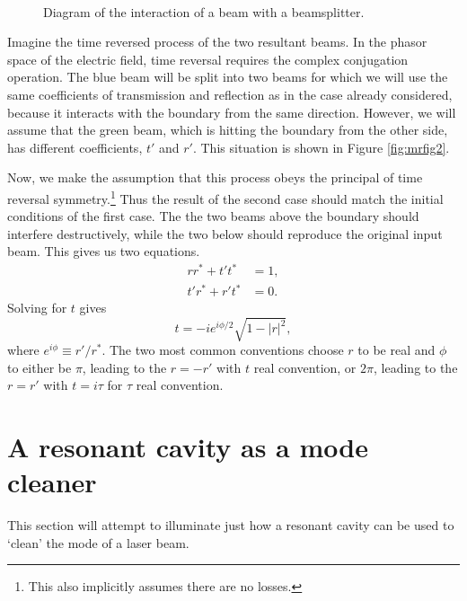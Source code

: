 \begin{figure}
  \begin{center}
  \leavevmode
  ~
  \end{center}
  \caption{Diagram of the interaction of a beam with a beamsplitter.}
  \label{fig:mrfig}
\end{figure}

Imagine the time reversed process of the two resultant beams. %
In the phasor space of the electric field, time reversal requires the complex conjugation operation. %
The blue beam will be split into two beams for which we will use the same coefficients of transmission and reflection as in the case already considered, because it interacts with the boundary from the same direction. %
However, we will assume that the green beam, which is hitting the boundary from the other side, has different coefficients, $t'$ and $r'$. %
This situation is shown in Figure \ref{fig:mrfig2}.

Now, we make the assumption that this process obeys the principal of time reversal symmetry.\footnote{This also implicitly assumes there are no losses.} Thus the result of the second case should match the initial conditions of the first case. %
The the two beams above the boundary should interfere destructively, while the two below should reproduce the original input beam. %
This gives us two equations.
\begin{align*}
rr^*+t't^*&=1,\\
t'r^*+r't^*&=0.
\end{align*}
Solving for $t$ gives
\begin{equation}
t=-ie^{i\phi/2}\sqrt{1-|r|^2},
\end{equation}
where $e^{i\phi}\equiv r'/r^*$. %
The two most common conventions choose $r$ to be real and $\phi$ to either be $\pi$, leading to the $r=-r'$ with $t$ real convention, or $2\pi$, leading to the $r=r'$ with $t=i\tau$ for $\tau$ real convention.

\section{A resonant cavity as a mode cleaner}
\label{sec:modecleanap}
This section will attempt to illuminate just how a resonant cavity can be used to `clean' the mode of a laser beam.

